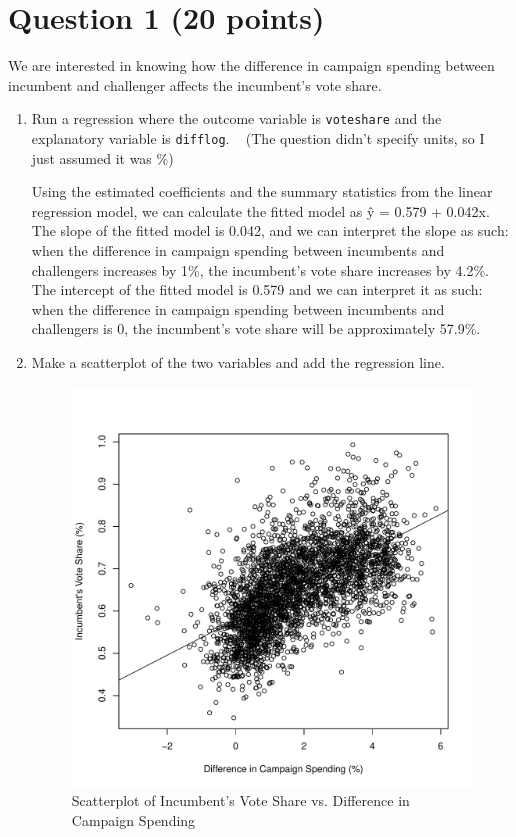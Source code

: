 \documentclass[12pt,letterpaper]{article}
\begin{document}
\section*{Question 1 (20 points)}
\vspace{.25cm}
\noindent We are interested in knowing how the difference in campaign spending between incumbent and challenger affects the incumbent's vote share. 
	\begin{enumerate}
		
		\item Run a regression where the outcome variable is \texttt{voteshare} and the explanatory variable is \texttt{difflog}.	\	 
		\newpage
	 	(The question didn't specify units, so I just assumed it was \%)
		
		Using the estimated coefficients and the summary statistics from the linear regression model, we can calculate the fitted model as \^{y} = 0.579 + 0.042x. The slope of the fitted model is 0.042, and we can interpret the slope as such: when the difference in campaign spending between incumbents and challengers increases by 1\%, the incumbent's vote share increases by 4.2\%. The intercept of the fitted model is 0.579 and we can interpret it as such: when the difference in campaign spending between incumbents and challengers is 0, the incumbent's vote share will be approximately 57.9\%.
		
		\item Make a scatterplot of the two variables and add the regression line.
		
			\begin{figure} [h]
			\centering
			\includegraphics[width=0.7\linewidth]{plotq1.pdf}
			\caption{Scatterplot of Incumbent's Vote Share vs. Difference in Campaign Spending}
			\label{fig:graph2}
		\end{figure}
	

\end{enumerate}
\end{document}
